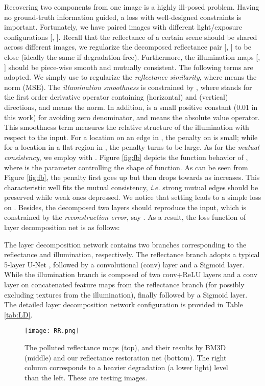 \documentclass[journal,10pt,compsoc]{IEEEtran}
\begin{document}
Recovering two components from one image is a highly ill-posed problem. Having no ground-truth information guided, a loss with well-designed constraints is important. Fortunately, we have paired images with different light/exposure configurations [, ]. Recall that the reflectance of a certain scene should be shared across different images, we regularize the decomposed reflectance pair [, ] to be close (ideally the same if degradation-free). Furthermore, the illumination maps [, ] should be piece-wise smooth and mutually consistent. The following terms are adopted. We simply use  to regularize the {\it reflectance similarity}, where  means the  norm (MSE). The {\it illumination smoothness} is constrained by , where  stands for the first order derivative operator containing  (horizontal) and  (vertical) directions, and  means the  norm. In addition,  is a small positive constant (0.01 in this work) for avoiding zero denominator, and  means the absolute value operator. This smoothness term measures the relative structure of the illumination with respect to the input. For a location on an edge in , the penalty on  is small; while for a location in a flat region in , the penalty turns to be large. As for the {\it mutual consistency}, we employ  with . Figure \ref{fig:fb} depicts the function behavior of , where  is the parameter controlling the shape of function. As can be seen from Figure \ref{fig:fb}, the penalty first goes up but then drops towards  as  increases. This characteristic well fits the mutual consistency, {\it i.e.} strong mutual edges should be preserved while weak ones depressed. We notice that setting  leads to a simple  loss on . Besides, the decomposed two layers should reproduce the input, which is constrained by the {\it reconstruction error}, say . As a result, the loss function of layer decomposition net is as follows:
  
The layer decomposition network contains two branches corresponding to the reflectance and illumination, respectively. The reflectance branch adopts a typical 5-layer U-Net \cite{UNet}, followed by a convolutional (conv) layer and a Sigmoid layer. While the illumination branch is composed of two conv+ReLU layers and a conv layer on concatenated feature maps from the reflectance branch (for possibly excluding textures from the illumination), finally followed by a Sigmoid layer. The detailed layer decomposition network configuration is provided in Table \ref{tab:LD}. 




\begin{figure}[t]
	
	\begin{center}
			\texttt{[image: RR.png]}
	\end{center}
	\caption{The polluted reflectance maps (top), and their results by BM3D (middle) and our reflectance restoration net (bottom). The right column corresponds to a heavier degradation (a lower light) level than the left. These are testing images.}
	\vspace{-0pt}
	\label{fig:RR}
\end{figure}
\end{document}
